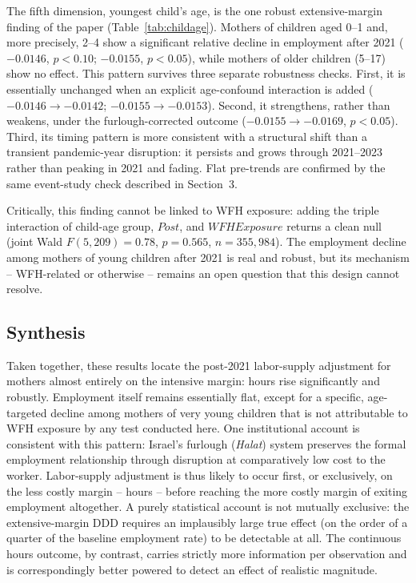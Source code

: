 \documentclass[11pt]{article}
\begin{document}
The fifth dimension, youngest child's age, is the one robust extensive-margin finding of the paper (Table~\ref{tab:childage}). Mothers of children aged 0--1 and, more precisely, 2--4 show a significant relative decline in employment after 2021 ($-0.0146$, $p<0.10$; $-0.0155$, $p<0.05$), while mothers of older children (5--17) show no effect. This pattern survives three separate robustness checks. First, it is essentially unchanged when an explicit age-confound interaction is added ($-0.0146\rightarrow-0.0142$; $-0.0155\rightarrow-0.0153$). Second, it strengthens, rather than weakens, under the furlough-corrected outcome ($-0.0155\rightarrow-0.0169$, $p<0.05$). Third, its timing pattern is more consistent with a structural shift than a transient pandemic-year disruption: it persists and grows through 2021--2023 rather than peaking in 2021 and fading. Flat pre-trends are confirmed by the same event-study check described in Section~3.

Critically, this finding cannot be linked to WFH exposure: adding the triple interaction of child-age group, $Post$, and $WFHExposure$ returns a clean null (joint Wald $F(5,209)=0.78$, $p=0.565$, $n=355{,}984$). The employment decline among mothers of young children after 2021 is real and robust, but its mechanism -- WFH-related or otherwise -- remains an open question that this design cannot resolve.

\subsection{Synthesis}

Taken together, these results locate the post-2021 labor-supply adjustment for mothers almost entirely on the intensive margin: hours rise significantly and robustly. Employment itself remains essentially flat, except for a specific, age-targeted decline among mothers of very young children that is not attributable to WFH exposure by any test conducted here. One institutional account is consistent with this pattern: Israel's furlough (\textit{Halat}) system preserves the formal employment relationship through disruption at comparatively low cost to the worker. Labor-supply adjustment is thus likely to occur first, or exclusively, on the less costly margin -- hours -- before reaching the more costly margin of exiting employment altogether. A purely statistical account is not mutually exclusive: the extensive-margin DDD requires an implausibly large true effect (on the order of a quarter of the baseline employment rate) to be detectable at all. The continuous hours outcome, by contrast, carries strictly more information per observation and is correspondingly better powered to detect an effect of realistic magnitude.
\end{document}
